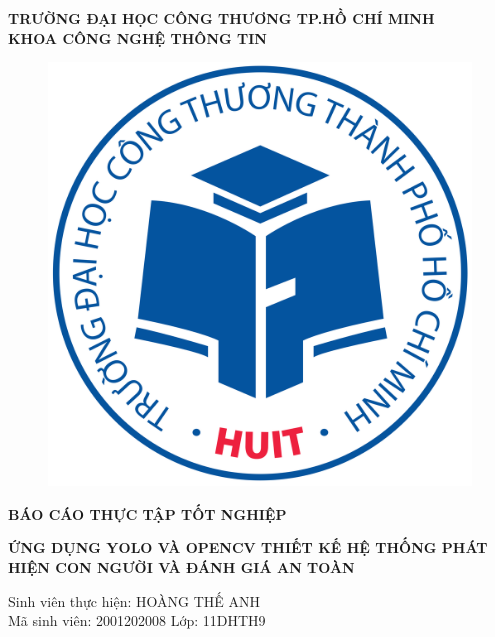 
\begin{center}
	\fontsize{16}{20}\selectfont
	\textbf{TRƯỜNG ĐẠI HỌC CÔNG THƯƠNG TP.HỒ CHÍ MINH\\ 
		\textbf{KHOA CÔNG NGHỆ THÔNG TIN}}
	
	\vspace{0.8cm}
	\begin{figure}[htp]
		\begin{center}
			\includegraphics[scale=0.08]{logo.png}
		\end{center}
	\end{figure}
	\vspace{1cm}
	\fontsize{24}{20}\selectfont\textbf{BÁO CÁO THỰC TẬP TỐT NGHIỆP\\}
	
	\vspace{3cm}
	\fontsize{24}{20}\selectfont\textbf{ỨNG DỤNG YOLO VÀ OPENCV THIẾT KẾ HỆ THỐNG PHÁT HIỆN CON NGƯỜI VÀ ĐÁNH GIÁ AN TOÀN}
\end{center}
\vspace{2cm}
\begin{center}
	\fontsize{14}{20}\selectfont\textit{}{Sinh viên thực hiện: HOÀNG THẾ ANH}\\
	\fontsize{14}{20}\selectfont\textit{}{Mã sinh viên: 2001202008 Lớp: 11DHTH9}

\end{center}
\pagebreak